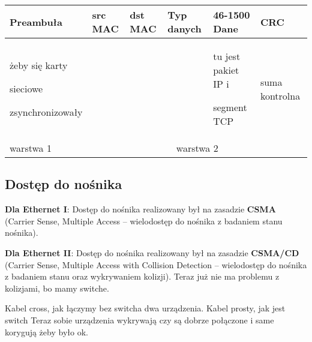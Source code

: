 \documentclass[../main.tex]{subfiles}
\begin{document}
    \begin{table}[H]
        \begin{center}
            \begin{tabular}{ | p{} | p{} | p{} | p{} | p{} | p{} | }
                \hline
                Preambuła & src MAC & dst MAC & Typ danych & 46-1500 Dane & CRC\\
                \hline
                żeby się karty

                sieciowe

                zsynchronizowały & & & & tu jest pakiet IP i

                segment TCP & suma kontrolna\\
                \hline
                warstwa 1 & \multicolumn{5}{c}{warstwa 2 }|\\
                \hline
            \end{tabular}
        \end{center}
    \end{table}

    \subsection{Dostęp do nośnika}

    \textbf{Dla Ethernet I}: Dostęp do nośnika realizowany był na zasadzie \textbf{CSMA} (Carrier Sense, Multiple Access – wielodostęp do nośnika z badaniem stanu nośnika).

    \textbf{Dla Ethernet II}: Dostęp do nośnika realizowany był na zasadzie \textbf{CSMA/CD} (Carrier Sense, Multiple Access with Collision Detection – wielodostęp do nośnika z badaniem stanu oraz wykrywaniem kolizji).
    Teraz już nie ma problemu z kolizjami, bo mamy switche.

    Kabel cross, jak łączymy bez switcha dwa urządzenia.
    Kabel prosty, jak jest switch
    Teraz sobie urządzenia wykrywają czy są dobrze połączone i same korygują żeby było ok.
\end{document}
